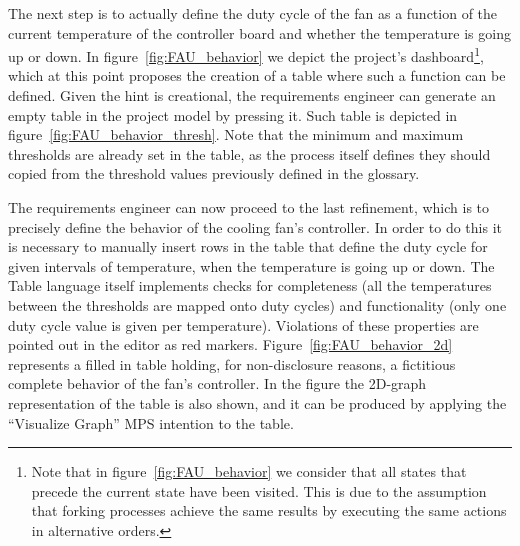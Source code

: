 The next step is to actually define the duty cycle of the fan as a function
of the current temperature of the controller board and whether the temperature
is going up or down. In figure~\ref{fig:FAU_behavior} we depict the project's
dashboard\footnote{Note that in figure~\ref{fig:FAU_behavior} we consider that
all states that precede the current state have been visited. This is due to the assumption
that forking processes achieve the same results by executing the same actions in
alternative orders.}, which at this point proposes the creation of a table where
such a function can be defined. 
Given the hint is creational, the requirements engineer can generate an empty
table in the project model by pressing it. Such table is depicted in
figure~\ref{fig:FAU_behavior_thresh}.
Note that the minimum and maximum thresholds are already set in the table, as
the process itself defines they should copied from the threshold values
previously defined in the glossary.

The requirements engineer can now proceed to the last refinement, which is to
precisely define the behavior of the cooling fan's controller. In order to do
this it is necessary to manually insert rows in the table that define the duty cycle for
given intervals of temperature, when the temperature is going up or down. 
The \textsf{Table} language itself implements checks for completeness (all the
temperatures between the thresholds are mapped onto duty cycles) and functionality (only one duty
cycle value is given per temperature). Violations of these properties are
pointed out in the editor as red markers.
Figure~\ref{fig:FAU_behavior_2d}
represents a filled in table holding, for non-disclosure reasons, a fictitious complete behavior of the fan's controller. In the figure the 2D-graph
representation of the table is also shown, and it can be produced by applying
the “Visualize Graph” MPS intention to the table.

